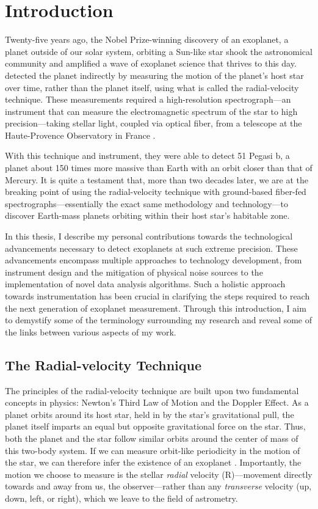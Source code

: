 \chapter{Introduction} \label{intro}

Twenty-five years ago, the Nobel Prize-winning discovery of an exoplanet, a planet outside of our solar system, orbiting a Sun-like star shook the astronomical community and amplified a wave of exoplanet science that thrives to this day. \citet{mayor_jupiter-mass_1995} detected the planet indirectly by measuring the motion of the planet's host star over time, rather than the planet itself, using what is called the radial-velocity technique. These measurements required a high-resolution spectrograph---an instrument that can measure the electromagnetic spectrum of the star to high precision---taking stellar light, coupled via optical fiber, from a telescope at the Haute-Provence Observatory in France \citep{baranne_elodie_1996}.

With this technique and instrument, they were able to detect 51 Pegasi b, a planet about 150 times more massive than Earth with an orbit closer than that of Mercury. It is quite a testament that, more than two decades later, we are at the breaking point of using the radial-velocity technique with ground-based fiber-fed spectrographs---essentially the exact same methodology and technology---to discover Earth-mass planets orbiting within their host star's habitable zone.

In this thesis, I describe my personal contributions towards the technological advancements necessary to detect exoplanets at such extreme precision. These advancements encompass multiple approaches to technology development, from instrument design and the mitigation of physical noise sources to the implementation of novel data analysis algorithms. Such a holistic approach towards instrumentation has been crucial in clarifying the steps required to reach the next generation of exoplanet measurement. Through this introduction, I aim to demystify some of the terminology surrounding my research and reveal some of the links between various aspects of my work.

\section{The Radial-velocity Technique} \label{intro:eprv}

The principles of the radial-velocity technique are built upon two fundamental concepts in physics: Newton's Third Law of Motion and the Doppler Effect. As a planet orbits around its host star, held in by the star's gravitational pull, the planet itself imparts an equal but opposite gravitational force on the star. Thus, both the planet and the star follow similar orbits around the center of mass of this two-body system. If we can measure orbit-like periodicity in the motion of the star, we can therefore infer the existence of an exoplanet \citep{lovis_radial_2011}. Importantly, the motion we choose to measure is the stellar \textit{radial} velocity (R)---movement directly towards and away from us, the observer---rather than any \textit{transverse} velocity (up, down, left, or right), which we leave to the field of astrometry.

